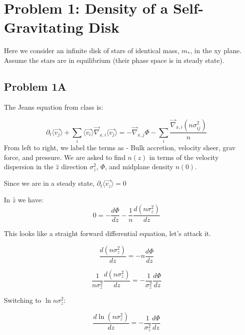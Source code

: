 \section*{Problem 1: Density of a Self-Gravitating Disk}

Here we consider an infinite disk of stars of identical mass, $m_{*}$, in the xy plane. Assume the stars are in equilibrium
(their phase space is in steady state).

\subsection{Problem 1A}



The Jeans equation from class is:

\begin{equation}
    \partial_t \langle{\vec{v_j}} \rangle + \sum_i \langle{\vec{v_i}} \rangle 
    \vec{\nabla}_{x, i} \langle{\vec{v_j}} \rangle = - \vec{\nabla}_{x, j} \Phi - \sum_i \frac{\vec{\nabla}_{x, i} (n\sigma_{ij}^2)}{n}
\end{equation}
From left to right, we label the terms as - Bulk accretion, velocity sheer, grav force, and pressure. We are asked to find  $n(z)$ in terms of the velocity dispersion in the $\hat{z}$ direction $\sigma_z^2$, $\Phi$, and midplane density $n(0)$.
    
Since we are in a steady state, $\partial_t \langle{\vec{v_z}} \rangle = 0$

In $\hat{z}$ we have: 
\begin{equation}
    0 = -\frac{d\Phi}{dz} - \frac{1}{n}\frac{d(n\sigma^2_z)}{dz}
\end{equation}

This looks like a straight forward differential equation, let's attack it. 

\begin{equation}
    \frac{d(n\sigma^2_z)}{dz} = - n\frac{d\Phi}{dz}
\end{equation}


\begin{equation}
    \frac{1}{n\sigma^2_z}\frac{d(n\sigma^2_z)}{dz} = -  \frac{1}{\sigma^2_z}\frac{d\Phi}{dz}
\end{equation}

Switching to $\ln{n \sigma_z^2}$:

\begin{equation}
    \frac{d\ln{(n\sigma^2_z)}}{dz} = -  \frac{1}{\sigma^2_z}\frac{d\Phi}{dz}
\end{equation}

